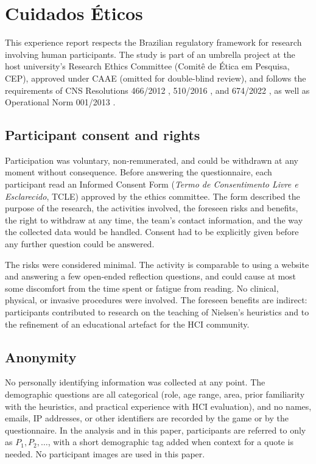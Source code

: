 \section{Cuidados Éticos}
\label{sec:ethics}

This experience report respects the Brazilian regulatory framework for research involving human participants. The study is part of an umbrella project at the host university's Research Ethics Committee (Comit\^{e} de \'{E}tica em Pesquisa, CEP), approved under CAAE (omitted for double-blind review), and follows the requirements of CNS Resolutions 466/2012 \cite{cns466_2012}, 510/2016 \cite{cns510_2016}, and 674/2022 \cite{cns674_2022}, as well as Operational Norm 001/2013 \cite{cns_no001_2013}.

\subsection{Participant consent and rights}

Participation was voluntary, non-remunerated, and could be withdrawn at any moment without consequence. Before answering the questionnaire, each participant read an Informed Consent Form (\emph{Termo de Consentimento Livre e Esclarecido}, TCLE) approved by the ethics committee. The form described the purpose of the research, the activities involved, the foreseen risks and benefits, the right to withdraw at any time, the team's contact information, and the way the collected data would be handled. Consent had to be explicitly given before any further question could be answered.

The risks were considered minimal. The activity is comparable to using a website and answering a few open-ended reflection questions, and could cause at most some discomfort from the time spent or fatigue from reading. No clinical, physical, or invasive procedures were involved. The foreseen benefits are indirect: participants contributed to research on the teaching of Nielsen's heuristics and to the refinement of an educational artefact for the HCI community.

\subsection{Anonymity}

No personally identifying information was collected at any point. The demographic questions are all categorical (role, age range, area, prior familiarity with the heuristics, and practical experience with HCI evaluation), and no names, emails, IP addresses, or other identifiers are recorded by the game or by the questionnaire. In the analysis and in this paper, participants are referred to only as $P_1, P_2, \ldots$, with a short demographic tag added when context for a quote is needed. No participant images are used in this paper.


